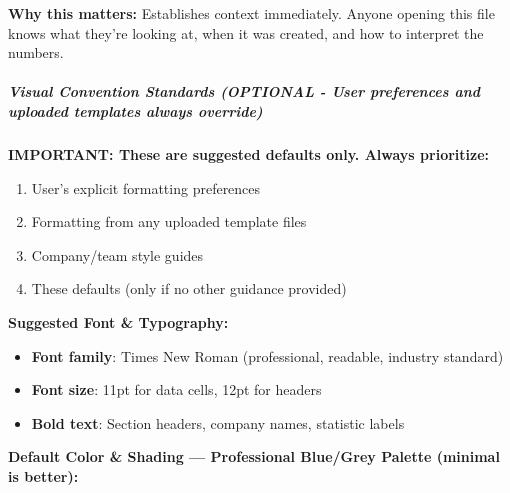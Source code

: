\documentclass[11pt]{article}
\begin{document}
\textbf{Why this matters:} Establishes context immediately. Anyone opening this file knows what they're looking at, when it was created, and how to interpret the numbers.


\subparagraph{Visual Convention Standards (OPTIONAL - User preferences and uploaded templates always override)}\mbox{}\par

\textbf{IMPORTANT: These are suggested defaults only. Always prioritize:}

\begin{enumerate}[leftmargin=*,itemsep=2pt,topsep=2pt]
\item {} User's explicit formatting preferences
\item {} Formatting from any uploaded template files
\item {} Company/team style guides
\item {} These defaults (only if no other guidance provided)
\end{enumerate}

\textbf{Suggested Font \& Typography:}

\begin{itemize}[leftmargin=*,itemsep=2pt,topsep=2pt]
\item {} \textbf{Font family}: Times New Roman (professional, readable, industry standard)
\item {} \textbf{Font size}: 11pt for data cells, 12pt for headers
\item {} \textbf{Bold text}: Section headers, company names, statistic labels
\end{itemize}

\textbf{Default Color \& Shading — Professional Blue/Grey Palette (minimal is better):}
\end{document}
